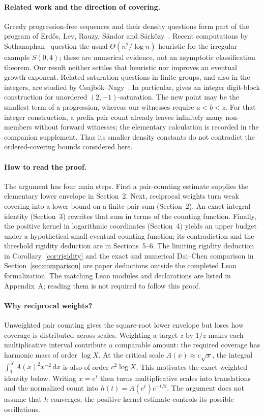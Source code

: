 \documentclass[11pt]{article}
\theoremstyle{definition}\newtheorem{definition}[theorem]{Definition}
\theoremstyle{remark}\newtheorem{remark}[theorem]{Remark}
\numberwithin{equation}{section}
\newcommand{\dd}{\,\mathrm d}
\begin{document}
\paragraph{Related work and the direction of covering.}
Greedy progression-free sequences and their density questions form part of the
program of Erd\H{o}s, Lev, Rauzy, S\'andor and S\'ark\"ozy~\cite{ELRSS}.
Recent computations by Sothanaphan~\cite{Soth} question the usual
$\Theta(n^2/\log n)$ heuristic for the irregular example $S(0,4)$; these are
numerical evidence, not an asymptotic classification theorem. Our result neither
settles that heuristic nor improves an eventual growth exponent.
Related saturation questions in finite groups, and also in the integers,
are studied by Csajb\'ok--Nagy~\cite{CN24,CN26}. In particular,
\cite[Theorem 4.13]{CN24} gives an integer digit-block construction for unordered
$(2,-1)$-saturation. The new point may be the smallest term of a progression,
whereas our witnesses require $a<b<z$. For that integer construction,
a prefix pair count already leaves infinitely many non-members without forward
witnesses; the elementary calculation is recorded in the companion supplement.
Thus its smaller density constants do not contradict the ordered-covering
bounds considered here.

\paragraph{How to read the proof.}
The argument has four main steps. First a pair-counting estimate supplies the elementary lower envelope in Section~2. Next, reciprocal weights turn weak covering into a lower bound on a finite pair sum (Section~2). An exact integral identity (Section~3) rewrites that sum in terms of the counting function. Finally, the positive kernel in logarithmic coordinates (Section~4) yields an upper budget under a hypothetical small eventual counting function; its contradiction and the threshold rigidity deduction are in Sections~5--6. The limiting rigidity deduction in Corollary~\ref{cor:rigidity} and the exact and numerical Dai--Chen comparison in Section~\ref{sec:comparison} are paper deductions outside the completed Lean formalization. The matching Lean modules and declarations are listed in Appendix~A; reading them is not required to follow this proof.

\paragraph{Why reciprocal weights?}
Unweighted pair counting gives the square-root lower envelope but loses how
coverage is distributed across scales. Weighting a target $z$ by $1/z$ makes
each multiplicative interval contribute a comparable amount: the required
coverage has harmonic mass of order $\log X$. At the critical scale
$A(x)\approx c\sqrt x$, the integral $\int_1^X A(x)^2x^{-2}\dd x$ is also of
order $c^2\log X$. This motivates the exact weighted identity below.
Writing $x=e^t$ then turns multiplicative scales into translations and the
normalized count into $h(t)=A(e^t)e^{-t/2}$. The argument does not assume that
$h$ converges; the positive-kernel estimate controls its possible oscillations.
\end{document}
